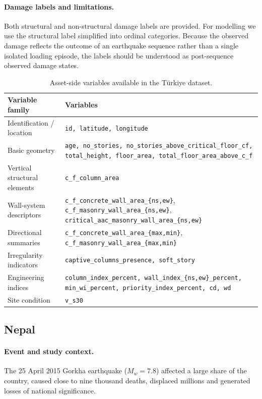 \documentclass[11pt,a4paper]{article}
\begin{document}
\paragraph{Damage labels and limitations.} Both structural and non-structural damage labels are provided. For modelling we use the structural label simplified into ordinal categories. Because the observed damage reflects the outcome of an earthquake sequence rather than a single isolated loading episode, the labels should be understood as post-sequence observed damage states.

\begin{table}[!t]
\centering
\caption{Asset-side variables available in the T\"urkiye dataset.}
\label{tab:turkiye-vars}
\small
\begin{tabularx}{\linewidth}{l X}
\toprule
\textbf{Variable family} & \textbf{Variables} \\
\midrule
Identification / location & \texttt{id, latitude, longitude} \\
Basic geometry & \texttt{age, no\_stories, no\_stories\_above\_critical\_floor\_cf,
total\_height, floor\_area, total\_floor\_area\_above\_c\_f} \\
Vertical structural elements & \texttt{c\_f\_column\_area} \\
Wall-system descriptors &
\texttt{c\_f\_concrete\_wall\_area\_\{ns,ew\}},
\texttt{c\_f\_masonry\_wall\_area\_\{ns,ew\}},
\texttt{critical\_aac\_masonry\_wall\_area\_\{ns,ew\}} \\
Directional summaries &
\texttt{c\_f\_concrete\_wall\_area\_\{max,min\}},
\texttt{c\_f\_masonry\_wall\_area\_\{max,min\}} \\
Irregularity indicators & \texttt{captive\_columns\_presence, soft\_story} \\
Engineering indices &
\texttt{column\_index\_percent, wall\_index\_\{ns,ew\}\_percent,
min\_wi\_percent, priority\_index\_percent, cd, wd} \\
Site condition & \texttt{v\_s30} \\
\bottomrule
\end{tabularx}
\end{table}

\subsection{Nepal}
\label{sec:data-nepal}

\paragraph{Event and study context.} The 25 April 2015 Gorkha earthquake ($M_w = 7.8$) affected a large share of the country, caused close to nine thousand deaths, displaced millions and generated losses of national significance.
\end{document}
